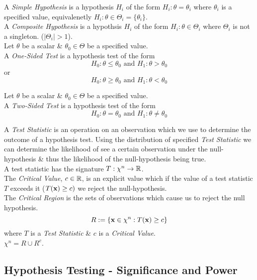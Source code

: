 \documentclass[11pt,a4paper]{article}
\begin{document}
A \textit{Simple Hypothesis} is a hypothesis $H_i$ of the form $H_i:\theta=\theta_i$ where $\theta_i$ is a specified value, equivalenetly $H_i:\theta\in\Theta_i=\{\theta_i\}$.\\

A \textit{Composite Hypothesis} is a hypothsis $H_i$ of the form $H_i:\theta\in\Theta_i$ where $\Theta_i$ is not a singleton. (\ie $|\Theta_i|>1$).\\

Let $\theta$ be a scalar \& $\theta_0\in\Theta$ be a specified value.\\
A \textit{One-Sided Test} is a hypothesis test of the form
$$H_0:\theta\leq\theta_0\text{ and }H_1:\theta>\theta_0$$
or
$$H_0:\theta\geq\theta_0\text{ and }H_1:\theta<\theta_0$$

Let $\theta$ be a scalar \& $\theta_0\in\Theta$ be a specified value.\\
A \textit{Two-Sided Test} is a hypothesis test of the form
$$H_0:\theta=\theta_0\text{ and }H_1:\theta\neq\theta_0$$

A \textit{Test Statistic} is an operation on an observation which we use to determine the outcome of a hypothesis test. Using the distribution of specified \textit{Test Statistic} we can determine the likelihood of see a certain observation under the null-hypothesis \& thus the likelihood of the null-hypothesis being true.\\
\nb A test statistic has the signature $T:\chi^n\to\mathbb{R}$.\\

The \textit{Critical Value}, $c\in\mathbb{R}$, is an explicit value which if the value of a test statistic $T$ exceeds it (\ie $T(\textbf{x})\geq c)$ we reject the null-hypothesis.\\

The \textit{Critical Region} is the sets of observations which cause us to reject the null hypothesis.
$$R:=\{\textbf{x}\in\chi^n:T(\textbf{x})\geq c\}$$
where $T$ is a \textit{Test Statistic} \& $c$ is a \textit{Critical Value}.\\
\nb $\chi^n=R\cup R^c$.\\

\subsection{Hypothesis Testing - Significance and Power}
\end{document}
